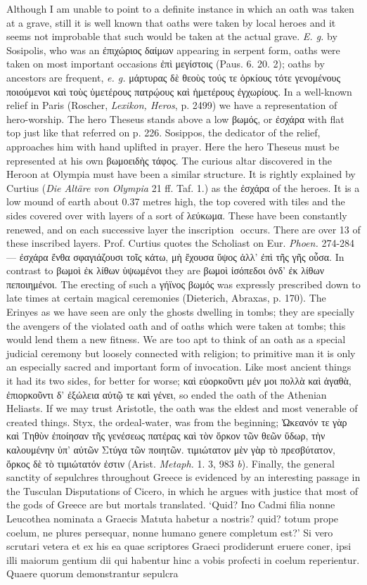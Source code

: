 \documentclass[a4paper, 11pt, oneside, polutonikogreek, english]{article}
\newcommand*\svgAAA{}
\begin{document}
Although I am unable to point to a definite instance in which an oath was taken at a grave, still it is well known that oaths were taken by local heroes and it seems not improbable that such would be taken at the actual grave. \emph{E. g.} by Sosipolis, who was an ἐπιχώριος δαίμων appearing in serpent form, oaths were taken on most important occasions ἐπὶ μεγίστοις (Paus. 6. 20. 2); oaths by ancestors are frequent, \emph{e. g.} μάρτυρας δὲ θεοὺς τούς τε ὁρκίους τότε γενομένους ποιούμενοι καὶ τοὺς ὑμετέρους πατρῴους καὶ ἡμετέρους ἐγχωρίους. In a well-known relief in Paris (Roscher, \emph{Lexikon, Heros}, p. 2499) we have a representation of hero-worship. The hero Theseus stands above a low βωμός, or ἐσχάρα with flat top just like that referred on p. 226. Sosippos, the dedicator of the relief, approaches him with hand uplifted in prayer. Here the hero Theseus must be represented at his own βωμοειδὴς τάφος. The curious altar discovered in the Heroon at Olympia must have been a similar structure. It is rightly explained by Curtius (\emph{Die Altäre von Olympia} 21 ff. Taf. 1.) as the ἐσχάρα of the heroes. It is a low mound of earth about 0.37 metres high, the top covered with tiles and the sides covered over with layers of a sort of λεύκωμα. These have been constantly renewed, and on each successive layer the inscription $\svgAAA$ occurs. There are over 13 of these inscribed layers. Prof. Curtius quotes the Scholiast on Eur. \emph{Phoen.} 274-284 --- ἐσχάρα ἔνθα σφαγιάζουσι τοῖς κάτω, μὴ ἔχουσα ὕψος ἀλλ' ἐπὶ τῆς γῆς οὖσα. In contrast to βωμοὶ ἐκ λίθων ὑψωμένοι they are βωμοὶ ἰσόπεδοι ὀνδ' ἐκ λίθων πεποιημένοι. The erecting of such a γήϊνος βωμός was expressly prescribed down to late times at certain magical ceremonies (Dieterich, Abraxas, p. 170). The Erinyes as we have seen are only the ghosts dwelling in tombs; they are specially the avengers of the violated oath and of oaths which were taken at tombs; this would lend them a new fitness. We are too apt to think of an oath as a special judicial ceremony but loosely connected with religion; to primitive man it is only an especially sacred and important form of invocation. Like most ancient things it had its two sides, for better for worse; καὶ εὐορκοῦντι μέν μοι πολλὰ καὶ ἀγαθὰ, ἐπιορκοῦντι δ' ἐξώλεια αὐτῷ τε καὶ γένει, so ended the oath of the Athenian Heliasts. If we may trust Aristotle, the oath was the eldest and most venerable of created things. Styx, the ordeal-water, was from the beginning; Ὠκεανόν τε γὰρ καὶ Τηθὺν ἐποίησαν τῆς γενέσεως πατέρας καὶ τὸν ὅρκον τῶν θεῶν ὕδωρ, τὴν καλουμένην ὑπ' αὐτῶν Στύγα τῶν ποιητῶν. τιμιώτατον μὲν γὰρ τὸ πρεσβύτατον, ὅρκος δὲ τὸ τιμιώτατόν ἐστιν (Arist. \emph{Metaph.} 1. 3, 983 \emph{b}). Finally, the general sanctity of sepulchres throughout Greece is evidenced by an interesting passage in the Tusculan Disputations of Cicero, in which he argues with justice that most of the gods of Greece are but mortals translated. `Quid? Ino Cadmi filia nonne Leucothea nominata a Graecis Matuta habetur a nostris? quid? totum prope coelum, ne plures persequar, nonne humano genere completum est?' Si vero scrutari vetera et ex his ea quae scriptores Graeci prodiderunt eruere coner, ipsi illi maiorum gentium dii qui habentur hinc a vobis profecti in coelum reperientur. Quaere quorum demonstrantur sepulcra 
\end{document}
